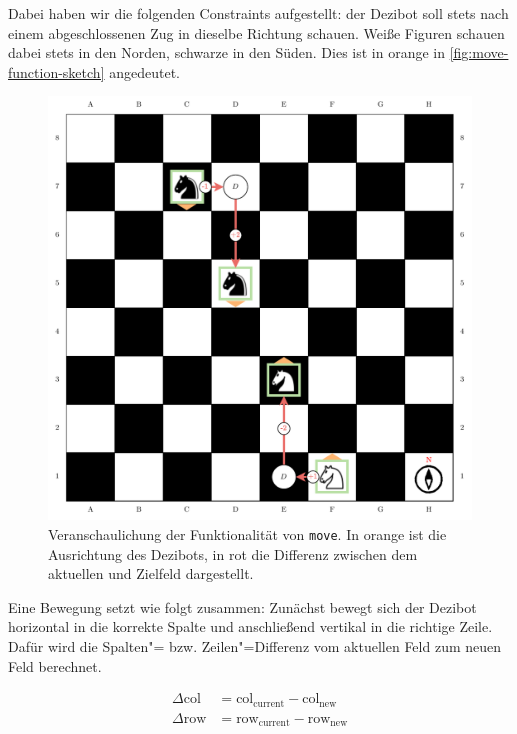 
Dabei haben wir die folgenden Constraints aufgestellt: der Dezibot soll stets nach einem abgeschlossenen Zug in dieselbe Richtung schauen. Weiße Figuren schauen dabei stets in den Norden, schwarze in den Süden. Dies ist in orange in \autoref{fig:move-function-sketch} angedeutet.

\begin{figure}[h]
    \includegraphics[width=\textwidth]{../assets/move_function_sketch.drawio.pdf}
    \caption{Veranschaulichung der Funktionalität von \texttt{move}. In orange ist die Ausrichtung des Dezibots, in rot die Differenz zwischen dem aktuellen und Zielfeld dargestellt.}
    \label{fig:move-function-sketch}
\end{figure}


Eine Bewegung setzt wie folgt zusammen: Zunächst bewegt sich der Dezibot horizontal in die korrekte Spalte und anschließend vertikal in die richtige Zeile. Dafür wird die Spalten"= bzw. Zeilen"=Differenz vom aktuellen Feld zum neuen Feld berechnet.

\begin{equation*}
    \begin{aligned}
        \Delta\text{col} &= \text{col}_{\text{current}} - \text{col}_{\text{new}} \\
        \Delta\text{row} &= \text{row}_{\text{current}} - \text{row}_{\text{new}}
    \end{aligned}
\end{equation*}

